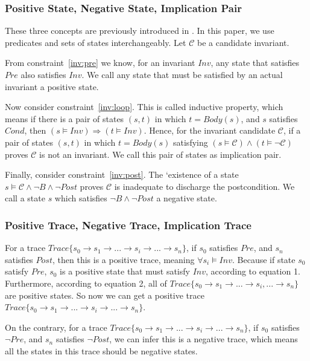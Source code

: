 \subsubsection{Positive State, Negative State, Implication Pair}
These three concepts are previously introduced in \cite{sharma2014invariant}.
In this paper, we use predicates and sets of states interchangeably.
Let $\mathcal{C}$ be a candidate invariant.

From constraint~\ref{inv:pre} we know, for an invariant $Inv$, 
any state that satisfies $Pre$ also satisfies $Inv$. 
We call any state that must be satisfied by an actual invariant a positive state. 


Now consider constraint~\ref{inv:loop}.
This is called inductive property, which means if there is a pair of states $(s, t)$ in which $t = Body(s)$, 
and $s$ satisfies $Cond$, then $(s \models Inv) \Rightarrow (t \models {Inv})$. 
Hence, for the invariant candidate $\mathcal{C}$, 
if a pair of states $(s, t)$ in which $t = Body(s)$ satisfying $(s \models \mathcal{C}) \wedge (t \models \neg \mathcal{C})$ proves $\mathcal{C}$ is not an invariant. 
We call this pair of states as implication pair.

Finally, consider constraint~\ref{inv:post}.
The `existence of a state $s \models \mathcal{C} \wedge \neg B \wedge \neg Post$ proves $\mathcal{C}$ is inadequate to discharge the postcondition. 
We call a state $s$ which satisfies $\neg{B} \wedge \neg{Post}$ a negative state. 



\subsubsection{Positive Trace, Negative Trace, Implication Trace}
For a trace $Trace\{s_0 \to s_1 \to ... \to s_i \to ... \to s_n\}$, 
if $s_0$ satisfies $Pre$, and $s_n$ satisfies $Post$,
then this is a positive trace, meaning $\forall s_i \models Inv$.
Because if state $s_0$ satisfy $Pre$,
$s_0$ is a positive state that must satisfy $Inv$, according to equation 1.
Furthermore, according to equation 2,
all of $Trace\{s_0 \to s_1 \to ...\to s_i, ... \to s_n\}$ are positive states.
So now we can get a positive trace  $Trace\{s_0 \to s_1 \to ...\to s_i \to ... \to s_n\}$.

On the contrary, for a trace $Trace\{s_0 \to s_1 \to ...\to s_i \to ... \to s_n\}$, 
if $s_0$ satisfies $\neg Pre$, and $s_n$ satisfies $\neg Post$,
we can infer this is a negative trace, 
which means all the states in this trace should be negative states.  

